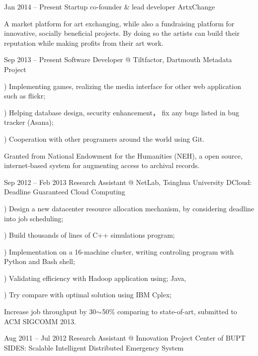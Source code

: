 \documentclass{tccv}
\begin{document}
\begin{eventlist}

\item{Jan 2014 -- Present}
     {Startup co-founder \& lead developer}
     {ArtxChange}
     
     A market platform for art exchanging, while also a fundraising platform for innovative, socially beneficial projects. By doing so the artists can build their reputation while making profits from their art work. 

\item{Sep 2013 -- Present}
     {Software Developer @ Tiltfactor, Dartmouth}
     {Metadata Project}
     
     ) Implementing games, realizing the media interface for other web application such as flickr;
     
     ) Helping database design, security enhancement， fix any bugs listed in bug tracker (Asana);
     
     ) Cooperation with other programers around the world using Git.
     
     Granted from National Endowment for the Humanities (NEH), a open source, internet‐based system for augmenting access to archival records.
     
     
\item{Sep 2012 -- Feb 2013}
     {Research Assistant @ NetLab, Tsinghua University}
     {DCloud: Deadline Guaranteed Cloud Computing}
     
     ) Design a new datacenter resource allocation mechanism, by considering deadline into job scheduling;
     
     ) Build thousands of lines of C++ simulations program;
     
     ) Implementation on a 16-machine cluster, writing controling  program with Python and Bash shell;
     
     ) Validating efficiency with Hadoop application using; Java, 
     
     ) Try compare with optimal solution using IBM Cplex;

     Increase job throughput by 30$\scriptsize{\sim}$50\% comparing to state-of-art, submitted to ACM SIGCOMM 2013.
     
\item{Aug 2011 -- Jul 2012}
     {Research Assistant @ Innovation Project Center of BUPT}
     {SIDES: Scalable Intelligent Distributed Emergency System}
     

\end{eventlist}
\end{document}
